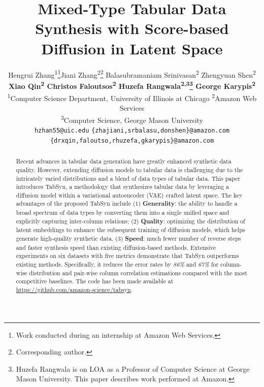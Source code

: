 \documentclass{article} %
\title{Mixed-Type Tabular Data Synthesis with Score-based Diffusion in Latent Space}
\author{Hengrui Zhang\textsuperscript{1}\thanks{Work conducted during an internship at Amazon Web Services.}\quad  Jiani Zhang\textsuperscript{2}\thanks{Corresponding author.} \quad Balasubramaniam Srinivasan\textsuperscript{2} \quad Zhengyuan Shen\textsuperscript{2} 
 \\ \textbf{Xiao Qin\textsuperscript{2} \quad Christos Faloutsos\textsuperscript{2} \quad Huzefa Rangwala\textsuperscript{2,3}\thanks{Huzefa Rangwala is on LOA as a Professor of Computer Science at George Mason University. This paper describes work performed at Amazon.} \quad George Karypis\textsuperscript{2}   } \\
\textsuperscript{1}Computer Science Department, University of Illinois at Chicago \quad \textsuperscript{2}Amazon Web Services \quad \\
\textsuperscript{3}Computer Science, George Mason University \quad
\\
\texttt{hzhan55@uic.edu} \quad \texttt{\{zhajiani,srbalasu,donshen\}@amazon.com}  \\
\texttt{\{drxqin,faloutso,rhuzefa,gkarypis\}@amazon.com}
}
\theoremstyle{plain}
\newcommand{\modelname}{{\sc TabSyn}\xspace}
\newcommand{\myEmphasis}[1]{{\bf #1}}
\newcommand{\generality}{\myEmphasis{Generality}\xspace}
\newcommand{\quality}{\myEmphasis{Quality}\xspace}
\newcommand{\speed}{\myEmphasis{Speed}\xspace}
\begin{document}
\maketitle

\begin{abstract}
Recent advances in tabular data generation have greatly enhanced synthetic data quality. However, extending diffusion models to tabular data is challenging due to the intricately varied distributions and a blend of data types of tabular data. This paper introduces \modelname, a methodology that synthesizes tabular data by leveraging a diffusion model within a variational autoencoder (VAE) crafted latent space. The key advantages of the proposed \modelname include
(1) \generality: the ability to handle a broad spectrum of data types by converting them into a single unified space and explicitly capturing inter-column relations; 
(2) \quality: optimizing the distribution of latent embeddings to enhance the subsequent training of diffusion models, which helps generate high-quality synthetic data, 
(3) \speed: much fewer number of reverse steps and faster synthesis speed than existing diffusion-based methods. Extensive experiments on six datasets with five metrics demonstrate that \modelname outperforms existing methods. Specifically, it reduces the error rates by {\em 86\%} and {\em 67\%}  for column-wise distribution and pair-wise column correlation estimations compared with the most competitive baselines. The code has been made available at \url{https://github.com/amazon-science/tabsyn}. 
\end{abstract}













\end{document}
